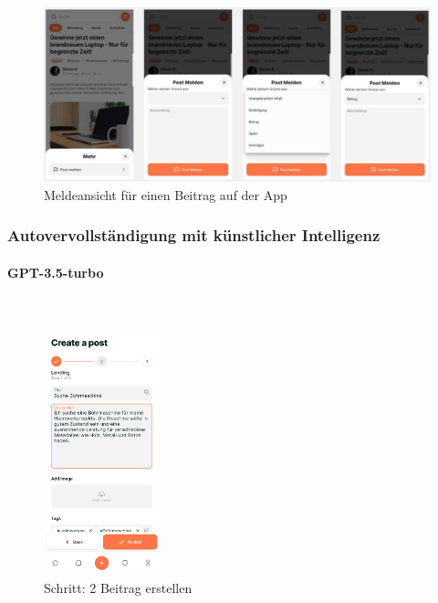 \begin{figure}[H]
  \centering
  \includegraphics[width=1\textwidth]{pics/report-post.JPG}
  \caption{Meldeansicht für einen Beitrag auf der App}
  \label{fig:report-post}
\end{figure}


\subsubsection{Autovervollständigung mit künstlicher Intelligenz}
\paragraph{GPT-3.5-turbo}\mbox{} \\


\begin{figure}[H]
  \centering
  \includegraphics[width=0.3\textwidth]{pics/create-post.png}
  \caption{Schritt: 2 Beitrag erstellen}
  \label{fig:createpost}
\end{figure}


